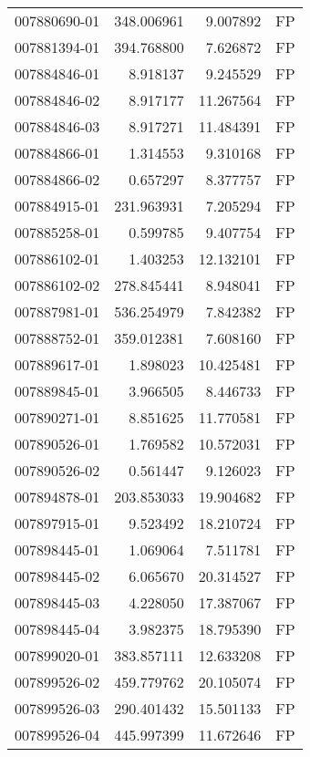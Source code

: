 \begin{tabular}{lrrl}
007880690-01 &  348.006961 &       9.007892 &   FP \\
007881394-01 &  394.768800 &       7.626872 &   FP \\
007884846-01 &    8.918137 &       9.245529 &   FP \\
007884846-02 &    8.917177 &      11.267564 &   FP \\
007884846-03 &    8.917271 &      11.484391 &   FP \\
007884866-01 &    1.314553 &       9.310168 &   FP \\
007884866-02 &    0.657297 &       8.377757 &   FP \\
007884915-01 &  231.963931 &       7.205294 &   FP \\
007885258-01 &    0.599785 &       9.407754 &   FP \\
007886102-01 &    1.403253 &      12.132101 &   FP \\
007886102-02 &  278.845441 &       8.948041 &   FP \\
007887981-01 &  536.254979 &       7.842382 &   FP \\
007888752-01 &  359.012381 &       7.608160 &   FP \\
007889617-01 &    1.898023 &      10.425481 &   FP \\
007889845-01 &    3.966505 &       8.446733 &   FP \\
007890271-01 &    8.851625 &      11.770581 &   FP \\
007890526-01 &    1.769582 &      10.572031 &   FP \\
007890526-02 &    0.561447 &       9.126023 &   FP \\
007894878-01 &  203.853033 &      19.904682 &   FP \\
007897915-01 &    9.523492 &      18.210724 &   FP \\
007898445-01 &    1.069064 &       7.511781 &   FP \\
007898445-02 &    6.065670 &      20.314527 &   FP \\
007898445-03 &    4.228050 &      17.387067 &   FP \\
007898445-04 &    3.982375 &      18.795390 &   FP \\
007899020-01 &  383.857111 &      12.633208 &   FP \\
007899526-02 &  459.779762 &      20.105074 &   FP \\
007899526-03 &  290.401432 &      15.501133 &   FP \\
007899526-04 &  445.997399 &      11.672646 &   FP \\

\end{tabular}
